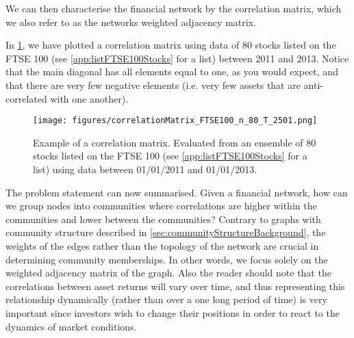 We can then characterise the financial network by the correlation matrix, which we also refer to as the networks weighted adjacency matrix.

In \cref{fig:exampleCrossCorrelationMatrix}, we have plotted a correlation matrix using data of 80 stocks listed on the FTSE 100 (see \cref{app:listFTSE100Stocks} for a list) between 2011 and 2013. Notice that the main diagonal has all elements equal to one, as you would expect, and that there are very few negative elements (i.e. very few assets that are anti-correlated with one another).

\begin{figure}
	\centering
	\texttt{[image: figures/correlationMatrix\_FTSE100\_n\_80\_T\_2501.png]}
	\caption[Example plot for a correlation matrix]{\label{fig:exampleCrossCorrelationMatrix} Example of a correlation matrix. Evaluated from an ensemble of 80 stocks listed on the FTSE 100 (see \cref{app:listFTSE100Stocks} for a list) using data between 01/01/2011 and 01/01/2013.}
\end{figure}

The problem statement can now summarised. Given a financial network, how can we group nodes into communities where correlations are higher within the communities and lower between the communities?
Contrary to graphs with community structure described in \cref{sec:communityStructureBackground}, the weights of the edges rather than the topology of the network are crucial in determining community memberships. In other words, we focus solely on the weighted adjacency matrix of the graph.
Also the reader should note that the correlations between asset returns will vary over time, and thus representing this relationship dynamically (rather than over a one long period of time) is very important since investors wish to change their positions in order to react to the dynamics of market conditions.

